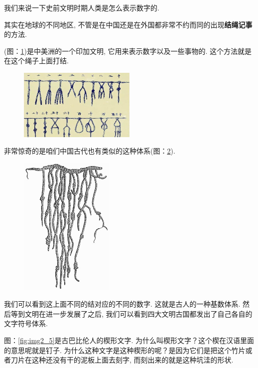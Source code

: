 我们来说一下史前文明时期人类是怎么表示数字的. 

其实在地球的不同地区, 不管是在中国还是在外国都非常不约而同的出现\textbf{结绳记事}的方法. 

(图：\ref{fig:img2_3})是中美洲的一个印加文明, 它用来表示数字以及一些事物的. 这个方法就是在这个绳子上面打结. 

\begin{figure}[ht]
  \centering\includegraphics[width=0.5\textwidth]{asset/73a095be-4ca9-4065-abb0-5d919706b1dd.png}
  \caption{}
  \label{fig:img2_3}
\end{figure}

非常惊奇的是咱们中国古代也有类似的这种体系(图：\ref{fig:img2_4}). 

\begin{figure}[ht]
  \centering\includegraphics[width=0.4\textwidth]{asset/840839db-800f-44f2-8f4a-b7e17b896222.png}
  \caption{}
  \label{fig:img2_4}
\end{figure}

我们可以看到这上面不同的结对应的不同的数字. 这就是古人的一种基数体系. 然后等到文明在进一步发展了之后, 我们可以看到四大文明古国都发出了自己各自的文字符号体系. 

图：\ref{fig:img2_5}是古巴比伦人的楔形文字. 为什么叫楔形文字？这个楔在汉语里面的意思呢就是钉子. 为什么这种文字是这种楔形的呢？是因为它们是把这个竹片或者刀片在这种还没有干的泥板上面去刻字, 而刻出来的就是这种坑洼的形状. 


